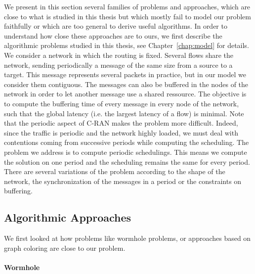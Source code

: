  We present in this section several families of problems and approaches, which are close to what is studied in this thesis but which mostly fail to model our problem faithfully or which are too general to derive useful algorithms. In order to understand how close these approaches are to ours, we first describe the algorithmic problems studied in this thesis, see Chapter~\ref{chap:model} for details. We consider a network in which the routing is fixed. Several flows share the network, sending periodically a message of the same size from a source to a target. This message represents several packets in practice, but in our model we consider them contiguous. The messages can also be buffered in the nodes of the network in order to let another message use a shared ressource. The objective is to compute the buffering time of every message in every node of the network, such that the global latency (i.e. the largest latency of a flow) is minimal. Note that the periodic aspect of C-RAN makes the problem more difficult. Indeed, since the traffic is periodic and the network highly loaded, we must deal with contentions coming from successive periods while computing the scheduling. The problem we address is to compute periodic schedulings. This means we compute the solution on one period and the scheduling remains the same for every period.
 There are several variations of the problem according to the shape of the network, the synchronization of the messages in a period or the constraints on buffering.
 

\subsection{Algorithmic Approaches}
We first looked at how problems like wormhole problems, or approaches based on graph coloring are close to our problem.

\paragraph{Wormhole}

